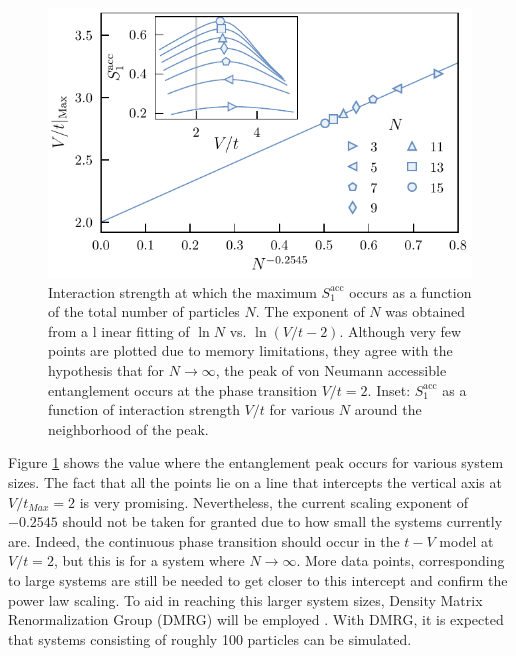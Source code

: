 	\begin{figure}[h!]
	\begin{center}
	\includegraphics[scale=1.0]{peakScalingOddN.pdf}
	\end{center}
	\caption{Interaction strength at which the maximum $S_{1}^{\mathrm{acc}}$ occurs as a 	function of the total number of particles $N$. The exponent of $N$ was obtained from a l	inear fitting of $\ln N$ vs. $\ln{(V/t - 2)}$.  Although very few points are plotted due to 	memory limitations, they agree with the hypothesis that for $N \to \infty$, the peak of 	von Neumann accessible entanglement occurs at the phase transition $V/t = 2$. Inset: 	$S_{1}^{\mathrm{acc}}$ as a function of interaction strength $V/t$ for various $N$ 		around the neighborhood of the peak.}
	\label{fig:peakScalingOddN}
	\end{figure}
	
	Figure \ref{fig:peakScalingOddN} shows the value where the entanglement peak occurs for various system sizes. The fact that all the points lie on a line that intercepts the vertical axis at $V/t_{Max}=2$ is very promising. Nevertheless, the current scaling exponent of $-0.2545$ should not be taken for granted due to how small the systems currently are. Indeed, the continuous phase transition should occur in the $t-V$ model at $V/t=2$, but this is for a system where $N \to \infty$. More data points, corresponding to large systems are still be needed to get closer to this intercept and confirm the power law scaling. To aid in reaching this larger system sizes, Density Matrix Renormalization Group (DMRG) will be employed \cite{SCHOLLWOCK201196, itensor}. With DMRG, it is expected that systems consisting of roughly 100 particles can be simulated.

